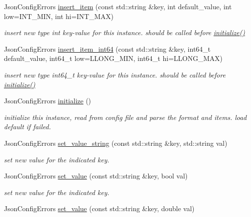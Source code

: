 \begin{DoxyCompactItemize}
Json\-Config\-Errors \hyperlink{classJsonConfig_ad2fdb7b3cbf7732476a89bf7e1445016}{insert\-\_\-item} (const std\-::string \&key, int default\-\_\-value, int low=I\-N\-T\-\_\-\-M\-I\-N, int hi=I\-N\-T\-\_\-\-M\-A\-X)
\begin{DoxyCompactList}\small\item\em insert new type int key-\/value for this instance. should be called before \hyperlink{classJsonConfig_ac25bb66c90b5c2ae6853376b288620c9}{initialize()} \end{DoxyCompactList}\item 
Json\-Config\-Errors \hyperlink{classJsonConfig_a80ef3345d0dc89987311546e59b7cb32}{insert\-\_\-item\-\_\-int64} (const std\-::string \&key, int64\-\_\-t default\-\_\-value, int64\-\_\-t low=L\-L\-O\-N\-G\-\_\-\-M\-I\-N, int64\-\_\-t hi=L\-L\-O\-N\-G\-\_\-\-M\-A\-X)
\begin{DoxyCompactList}\small\item\em insert new type int64\-\_\-t key-\/value for this instance. should be called before \hyperlink{classJsonConfig_ac25bb66c90b5c2ae6853376b288620c9}{initialize()} \end{DoxyCompactList}\item 
Json\-Config\-Errors \hyperlink{classJsonConfig_ac25bb66c90b5c2ae6853376b288620c9}{initialize} ()
\begin{DoxyCompactList}\small\item\em initialize this instance, read from config file and parse the format and items. load default if failed. \end{DoxyCompactList}\item 
Json\-Config\-Errors \hyperlink{classJsonConfig_a543f847c45a1bdedf827e677a37e6b9f}{set\-\_\-value\-\_\-string} (const std\-::string \&key, std\-::string val)
\begin{DoxyCompactList}\small\item\em set new value for the indicated key. \end{DoxyCompactList}\item 
Json\-Config\-Errors \hyperlink{classJsonConfig_a75e2fb241ffef61f1696d6326dc7e438}{set\-\_\-value} (const std\-::string \&key, bool val)
\begin{DoxyCompactList}\small\item\em set new value for the indicated key. \end{DoxyCompactList}\item 
Json\-Config\-Errors \hyperlink{classJsonConfig_adf59d8ff5dea77092e5d1c4f22f9d3ce}{set\-\_\-value} (const std\-::string \&key, double val)

\end{DoxyCompactItemize}
